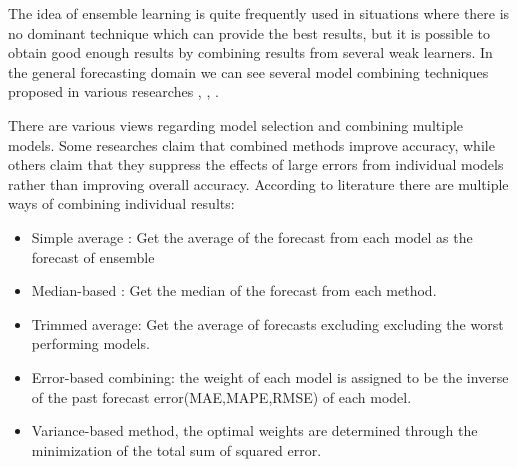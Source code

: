 The idea of ensemble learning is quite frequently used in situations where there is no dominant technique which can provide the best results, but it is possible to obtain good enough results by combining results from several weak learners. In the general forecasting domain we can see several model combining techniques proposed in various researches \cite{Zou_2004}, \cite{Wagner_2011},
\cite{Zhang_2003}.  

There are various views regarding model selection and combining multiple models. Some researches claim that combined methods improve accuracy, while others claim that they suppress the effects of large errors from individual models rather than improving overall accuracy. According to literature there are multiple ways of combining individual results\cite{Adhikari_2012}:

\begin{itemize}
\item Simple average : Get the average of the forecast from each model as the forecast of ensemble
\item Median-based :  Get the median of the forecast from each method.
\item Trimmed average: Get the average of forecasts excluding  excluding the worst performing models.
\item Error-based combining: the weight of each model is assigned to be the inverse of the past forecast error(MAE,MAPE,RMSE) of each model.
\item Variance-based method, the optimal weights are determined through the minimization of the total sum of squared error.
\end{itemize}